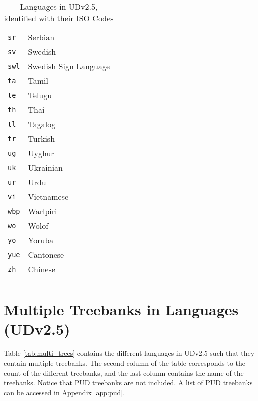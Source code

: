 \begin{longtable}{|l|l|}
\texttt{sr} & Serbian \\
\texttt{sv} & Swedish \\
\texttt{swl} & Swedish Sign Language \\
\texttt{ta} & Tamil \\
\texttt{te} & Telugu \\
\texttt{th} & Thai \\
\texttt{tl} & Tagalog \\
\texttt{tr} & Turkish \\
\texttt{ug} & Uyghur \\
\texttt{uk} & Ukrainian \\
\texttt{ur} & Urdu \\
\texttt{vi} & Vietnamese \\
\texttt{wbp} & Warlpiri \\
\texttt{wo} & Wolof \\
\texttt{yo} & Yoruba \\
\texttt{yue} & Cantonese \\
\texttt{zh} & Chinese \\
    \hline
    \caption{Languages in UDv2.5, identified with their ISO Codes}
    \end{longtable}

\newpage

\section{Multiple Treebanks in Languages (UDv2.5)}
\label{app:multi_trees}

Table \ref{tab:multi_trees} contains the different languages in UDv2.5 such that they contain multiple treebanks. The second column of the table corresponds to the count of the different treebanks, and the last column contains the name of the treebanks. Notice that PUD treebanks are not included. A list of PUD treebanks can be accessed in Appendix \ref{app:pud}.

